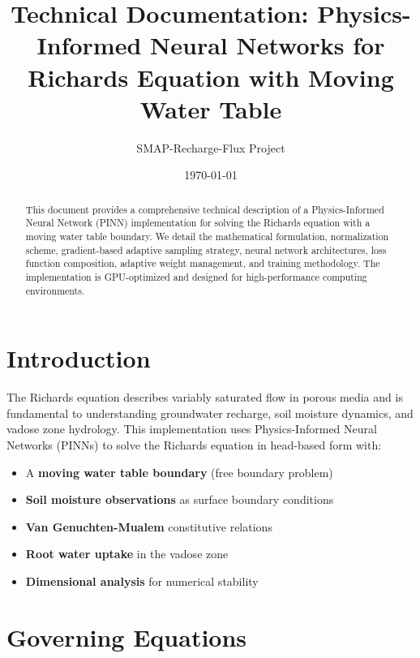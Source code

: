 \documentclass[11pt,a4paper]{article}
\title{\textbf{Technical Documentation: Physics-Informed Neural Networks for Richards Equation with Moving Water Table}}
\author{SMAP-Recharge-Flux Project}
\date{\today}
\begin{document}
\maketitle

\begin{abstract}
This document provides a comprehensive technical description of a Physics-Informed Neural Network (PINN) implementation for solving the Richards equation with a moving water table boundary. We detail the mathematical formulation, normalization scheme, gradient-based adaptive sampling strategy, neural network architectures, loss function composition, adaptive weight management, and training methodology. The implementation is GPU-optimized and designed for high-performance computing environments.
\end{abstract}

\tableofcontents
\newpage

\section{Introduction}

The Richards equation describes variably saturated flow in porous media and is fundamental to understanding groundwater recharge, soil moisture dynamics, and vadose zone hydrology. This implementation uses Physics-Informed Neural Networks (PINNs) to solve the Richards equation in head-based form with:

\begin{itemize}
    \item A \textbf{moving water table boundary} (free boundary problem)
    \item \textbf{Soil moisture observations} as surface boundary conditions
    \item \textbf{Van Genuchten-Mualem} constitutive relations
    \item \textbf{Root water uptake} in the vadose zone
    \item \textbf{Dimensional analysis} for numerical stability
\end{itemize}

\section{Governing Equations}
\end{document}
